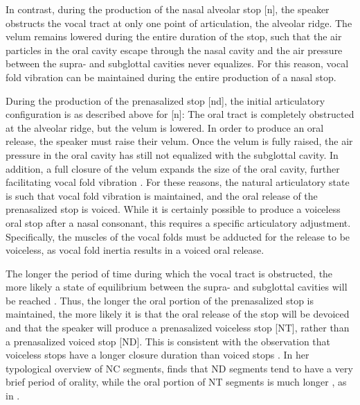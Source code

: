\documentclass[output=paper,hidelinks]{langscibook}
\begin{document}
In contrast, during the production of the nasal alveolar stop [n], the speaker obstructs the vocal tract at only one point of articulation, the alveolar ridge. The velum remains lowered during the entire duration of the stop, such that the air particles in the oral cavity escape through the nasal cavity and the air pressure between the supra- and subglottal cavities never equalizes. For this reason, vocal fold vibration can be maintained during the entire production of a nasal stop.

\largerpage
\begin{sloppypar}
During the production of the prenasalized stop [nd], the initial articulatory configuration is as described above for [n]: The oral tract is completely obstructed at the alveolar ridge, but the velum is lowered. In order to produce an oral release, the speaker must raise their velum. Once the velum is fully raised, the air pressure in the oral cavity has still not equalized with the subglottal cavity. In addition, a full closure of the velum expands the size of the oral cavity, further facilitating vocal fold vibration \citep{HayesStivers1995}. For these reasons, the natural articulatory state is such that vocal fold vibration is maintained, and the oral release of the prenasalized stop is voiced. While it is certainly possible to produce a voiceless oral stop after a nasal consonant, this requires a specific articulatory adjustment. Specifically, the muscles of the vocal folds must be adducted for the release to be voiceless, as vocal fold inertia results in a voiced oral release. 
\end{sloppypar}

The longer the period of time during which the vocal tract is obstructed, the more likely a state of equilibrium between the supra- and subglottal cavities will be reached \citep{Sole2010, Sole2012}. Thus, the longer the oral portion of the prenasalized stop is maintained, the more likely it is that the oral release of the stop will be devoiced and that the speaker will produce a prenasalized voiceless stop [NT], rather than a prenasalized voiced stop [ND]. This is consistent with the observation that voiceless stops have a longer closure duration than voiced stops \citep{MassaroCohen1983}. In her typological overview of NC segments, \citet{stanton2017} finds that ND segments tend to have a very brief period of orality, while the oral portion of NT segments is much longer \citep{MaddiesonLadefoged1993, LadefogedMaddieson1996, Riehl2008, CohnRiehl2012}, as in .
\end{document}

